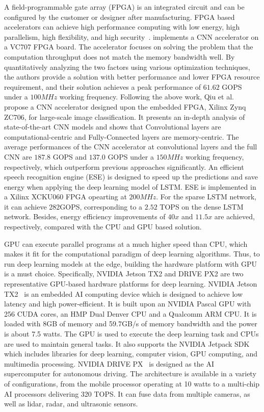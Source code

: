 A field-programmable gate array (FPGA) is an integrated circuit and can be configured by the customer or designer after manufacturing. FPGA based accelerators can achieve high performance computing with low energy, high parallelism, high flexibility, and high security~.
 implements a CNN accelerator on a VC707 FPGA board. The accelerator focuses on solving the problem that the computation throughput does not match the memory bandwidth well. By quantitatively analyzing the two factors using various optimization techniques, the authors provide a solution with better performance and lower FPGA resource requirement, and their solution achieves a peak performance of $61.62$ GOPS under a $100MHz$ working frequency. 
Following the above work, Qiu et al.~ propose a CNN accelerator designed upon the embedded FPGA, Xilinx Zynq ZC706, for large-scale image classification. It presents an in-depth analysis of state-of-the-art CNN models and shows that Convolutional layers are computational-centric and Fully-Connected layers are memory-centric. The average performances of the CNN accelerator at convolutional layers and the full CNN are $187.8$ GOPS and $137.0$ GOPS under a $150MHz$ working frequency, respectively, which outperform previous approaches significantly.
An efficient speech recognition engine (ESE) is designed to speed up the predictions and save energy when applying the deep learning model of LSTM. ESE is implemented in a Xilinx XCKU060 FPGA opearting at $200MHz$. For the sparse LSTM network, it can achieve 282GOPS, corresponding to a $2.52$ TOPS on the dense LSTM network. Besides, energy efficiency improvements of $40x$ and $11.5x$ are achieved, respectively, compared with the CPU and GPU based solution.

GPU can execute parallel programs at a much higher speed than CPU, which makes it fit for the computational paradigm of deep learning algorithms. Thus, to run deep learning models at the edge, building the hardware platform with GPU is a must choice. Specifically, NVIDIA Jetson TX2 and DRIVE PX2 are two representative GPU-based hardware platforms for deep learning.
NVIDIA Jetson TX2~ is an embedded AI computing device which is designed to achieve low latency and high power-efficient. It is built upon an NVIDIA Pascal GPU with 256 CUDA cores, an HMP Dual Denver CPU and a Qualcomm ARM CPU. It is loaded with 8GB of memory and 59.7GB/s of memory bandwidth and the power is about 7.5 watts. The GPU is used to execute the deep learning task and CPUs are used to maintain general tasks. It also supports the NVIDIA Jetpack SDK which includes libraries for deep learning, computer vision, GPU computing, and multimedia processing.
NVIDIA DRIVE PX~ is designed as the AI supercomputer for autonomous driving. The architecture is available in a variety of configurations, from the mobile processor operating at 10 watts to a multi-chip AI processors delivering 320 TOPS. It can fuse data from multiple cameras, as well as lidar, radar, and ultrasonic sensors.

